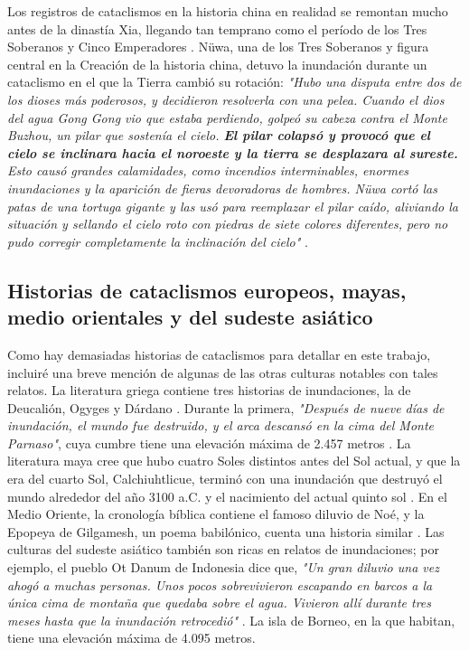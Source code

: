 \documentclass[10pt,twocolumn,letterpaper]{article}
\begin{document}
Los registros de cataclismos en la historia china en realidad se remontan mucho antes de la dinastía Xia, llegando tan temprano como el período de los Tres Soberanos y Cinco Emperadores \cite{7}. Nüwa, una de los Tres Soberanos y figura central en la Creación de la historia china, detuvo la inundación durante un cataclismo en el que la Tierra cambió su rotación: \textit{"Hubo una disputa entre dos de los dioses más poderosos, y decidieron resolverla con una pelea. Cuando el dios del agua Gong Gong vio que estaba perdiendo, golpeó su cabeza contra el Monte Buzhou, un pilar que sostenía el cielo. \textbf{El pilar colapsó y provocó que el cielo se inclinara hacia el noroeste y la tierra se desplazara al sureste.} Esto causó grandes calamidades, como incendios interminables, enormes inundaciones y la aparición de fieras devoradoras de hombres. Nüwa cortó las patas de una tortuga gigante y las usó para reemplazar el pilar caído, aliviando la situación y sellando el cielo roto con piedras de siete colores diferentes, pero no pudo corregir completamente la inclinación del cielo"} \cite{8}.

\subsection{Historias de cataclismos europeos, mayas, medio orientales y del sudeste asiático}

Como hay demasiadas historias de cataclismos para detallar en este trabajo, incluiré una breve mención de algunas de las otras culturas notables con tales relatos. La literatura griega contiene tres historias de inundaciones, la de Deucalión, Ogyges y Dárdano \cite{9,10}. Durante la primera, \textit{"Después de nueve días de inundación, el mundo fue destruido, y el arca descansó en la cima del Monte Parnaso"}, cuya cumbre tiene una elevación máxima de 2.457 metros \cite{11}. La literatura maya cree que hubo cuatro Soles distintos antes del Sol actual, y que la era del cuarto Sol, Calchiuhtlicue, terminó con una inundación que destruyó el mundo alrededor del año 3100 a.C. y el nacimiento del actual quinto sol \cite{12}. En el Medio Oriente, la cronología bíblica contiene el famoso diluvio de Noé, y la Epopeya de Gilgamesh, un poema babilónico, cuenta una historia similar \cite{13}. Las culturas del sudeste asiático también son ricas en relatos de inundaciones; por ejemplo, el pueblo Ot Danum de Indonesia dice que, \textit{"Un gran diluvio una vez ahogó a muchas personas. Unos pocos sobrevivieron escapando en barcos a la única cima de montaña que quedaba sobre el agua. Vivieron allí durante tres meses hasta que la inundación retrocedió"} \cite{3}. La isla de Borneo, en la que habitan, tiene una elevación máxima de 4.095 metros.
\end{document}
